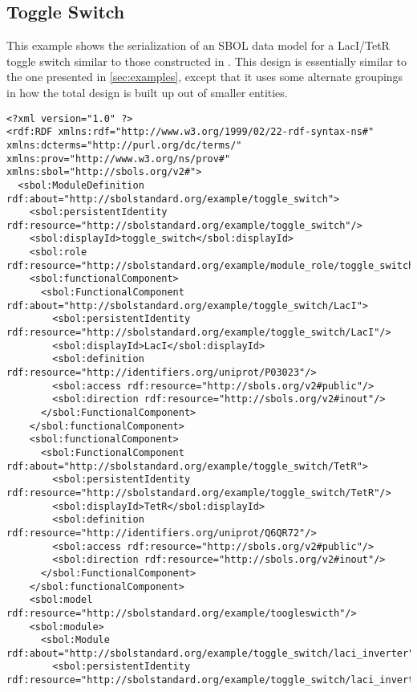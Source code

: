 \subsection{Toggle Switch}

This example shows the serialization of an SBOL data model for a LacI/TetR toggle switch similar to those constructed in \cite{Gardner2000}.  
This design is essentially similar to the one presented in \ref{sec:examples}, except that it uses some alternate groupings in how the total design is built up out of smaller entities.

\label{ser:toggleswitch}
\begin{lstlisting}
<?xml version="1.0" ?>
<rdf:RDF xmlns:rdf="http://www.w3.org/1999/02/22-rdf-syntax-ns#" xmlns:dcterms="http://purl.org/dc/terms/" xmlns:prov="http://www.w3.org/ns/prov#" xmlns:sbol="http://sbols.org/v2#">
  <sbol:ModuleDefinition rdf:about="http://sbolstandard.org/example/toggle_switch">
    <sbol:persistentIdentity rdf:resource="http://sbolstandard.org/example/toggle_switch"/>
    <sbol:displayId>toggle_switch</sbol:displayId>
    <sbol:role rdf:resource="http://sbolstandard.org/example/module_role/toggle_switch"/>
    <sbol:functionalComponent>
      <sbol:FunctionalComponent rdf:about="http://sbolstandard.org/example/toggle_switch/LacI">
        <sbol:persistentIdentity rdf:resource="http://sbolstandard.org/example/toggle_switch/LacI"/>
        <sbol:displayId>LacI</sbol:displayId>
        <sbol:definition rdf:resource="http://identifiers.org/uniprot/P03023"/>
        <sbol:access rdf:resource="http://sbols.org/v2#public"/>
        <sbol:direction rdf:resource="http://sbols.org/v2#inout"/>
      </sbol:FunctionalComponent>
    </sbol:functionalComponent>
    <sbol:functionalComponent>
      <sbol:FunctionalComponent rdf:about="http://sbolstandard.org/example/toggle_switch/TetR">
        <sbol:persistentIdentity rdf:resource="http://sbolstandard.org/example/toggle_switch/TetR"/>
        <sbol:displayId>TetR</sbol:displayId>
        <sbol:definition rdf:resource="http://identifiers.org/uniprot/Q6QR72"/>
        <sbol:access rdf:resource="http://sbols.org/v2#public"/>
        <sbol:direction rdf:resource="http://sbols.org/v2#inout"/>
      </sbol:FunctionalComponent>
    </sbol:functionalComponent>
    <sbol:model rdf:resource="http://sbolstandard.org/example/toogleswicth"/>
    <sbol:module>
      <sbol:Module rdf:about="http://sbolstandard.org/example/toggle_switch/laci_inverter">
        <sbol:persistentIdentity rdf:resource="http://sbolstandard.org/example/toggle_switch/laci_inverter"/>

\end{lstlisting}
